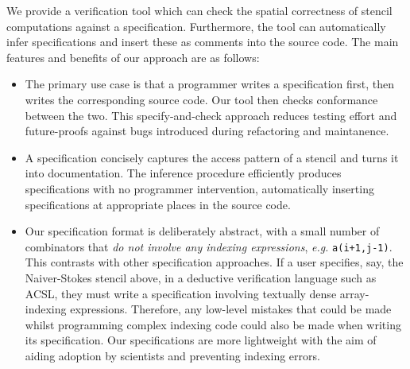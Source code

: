 \documentclass[10pt,preprint,numbers]{sigplanconf}
\theoremstyle{definition}
\newcommand{\eg}{\emph{e.g.}}
\begin{document}
We provide a verification tool which can check the spatial correctness
of stencil computations against a specification. Furthermore, the tool
can automatically infer specifications and insert these as comments
into the source code. The main features and benefits of our approach
are as follows:
%
\begin{itemize}
\item The primary use case is that a programmer writes a specification first,
  then writes the corresponding source code. Our tool then checks conformance between
  the two. This specify-and-check approach reduces testing effort and
  future-proofs against bugs introduced during refactoring and maintanence.
%

\item A specification concisely captures the access pattern of a
  stencil and turns it into documentation. The inference procedure
  efficiently produces specifications with no programmer intervention,
  automatically inserting specifications at appropriate places in the
  source code.
%
%
\item Our specification format is deliberately abstract, with a small number of
  combinators that \emph{do not involve any indexing expressions}, \eg{}
  \texttt{a(i+1,j-1)}. This contrasts with other specification approaches. If a
  user specifies, say, the Naiver-Stokes stencil above, in a deductive
  verification language such as ACSL, they must write a specification involving
  textually dense array-indexing expressions. Therefore, any low-level mistakes
  that could be made whilst programming complex indexing code could also be
  made when writing its specification. Our specifications are more lightweight
  with the aim of aiding adoption by scientists and preventing indexing errors.
\end{itemize}
\end{document}
